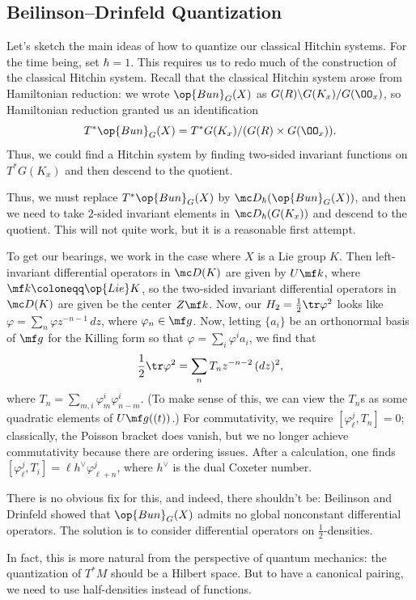 \documentclass[../notes.tex]{subfiles}
\begin{document}
\subsection{Beilinson--Drinfeld Quantization}
Let's sketch the main ideas of how to quantize our classical Hitchin systems. For the time being, set $\hbar=1$. This requires us to redo much of the construction of the classical Hitchin system. Recall that the classical Hitchin system arose from Hamiltonian reduction: we wrote $\op{Bun}_G(X)$ as $G(R)\backslash G(K_x)/G(\OO_x)$, so Hamiltonian reduction granted us an identification
\[T^*\op{Bun}_G(X)=T^*G(K_x)/(G(R)\times G(\OO_x)).\]
Thus, we could find a Hitchin system by finding two-sided invariant functions on $T^*G(K_x)$ and then descend to the quotient.

Thus, we must replace $T^*\op{Bun}_G(X)$ by $\mc D_{\hbar}(\op{Bun}_G(X))$, and then we need to take $2$-sided invariant elements in $\mc D_{\hbar}(G(K_x))$ and descend to the quotient. This will not quite work, but it is a reasonable first attempt.
\begin{example}
	To get our bearings, we work in the case where $X$ is a Lie group $K$. Then left-invariant differential operators in $\mc D(K)$ are given by $U\mf k$, where $\mf k\coloneqq\op{Lie}K$, so the two-sided invariant differential operators in $\mc D(K)$ are given be the center $Z\mf k$. Now, our $H_2=\frac12\tr\varphi^2$ looks like $\varphi=\sum_n\varphi z^{-n-1}\,dz$, where $\varphi_n\in\mf g$. Now, letting $\{a_i\}$ be an orthonormal basis of $\mf g$ for the Killing form so that $\varphi=\sum_i\varphi^ia_i$, we find that
	\[\frac12\tr\varphi^2=\sum_nT_nz^{-n-2}\,(dz)^2,\]
	where $T_n=\sum_{m,i}\varphi^i_m\varphi^{i}_{n-m}$. (To make sense of this, we can view the $T_n$s as some quadratic elements of $U\mf g((t))$.) For commutativity, we require $[\varphi^j_\ell,T_n]=0$; classically, the Poisson bracket does vanish, but we no longer achieve commutativity because there are ordering issues. After a calculation, one finds $[\varphi^j_\ell,T_i]=\ell h^\lor\varphi^j_{\ell+n}$, where $h^\lor$ is the dual Coxeter number.
\end{example}
There is no obvious fix for this, and indeed, there shouldn't be: Beilinson and Drinfeld showed that $\op{Bun}_G(X)$ admits no global nonconstant differential operators. The solution is to consider differential operators on $\frac12$-densities.
\begin{remark}
	In fact, this is more natural from the perspective of quantum mechanics: the quantization of $T^*M$ should be a Hilbert space. But to have a canonical pairing, we need to use half-densities instead of functions.
\end{remark}
\end{document}
